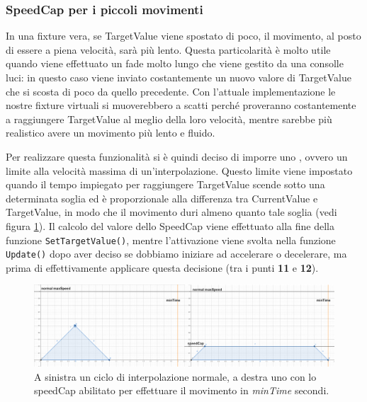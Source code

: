 \documentclass[main.tex]{subfiles}
\begin{document}
\subsubsection{SpeedCap per i piccoli movimenti}\label{subsubsec:4_2_Speedcap}
In una fixture vera, se TargetValue viene spostato di poco, il movimento, al posto di essere a piena velocità, sarà più lento. Questa particolarità è molto utile quando viene effettuato un fade molto lungo che viene gestito da una consolle luci: in questo caso viene inviato costantemente un nuovo valore di TargetValue che si scosta di poco da quello precedente. Con l'attuale implementazione le nostre fixture virtuali si muoverebbero a scatti perché proveranno costantemente a raggiungere TargetValue al meglio della loro velocità, mentre sarebbe più realistico avere un movimento più lento e fluido. 

Per realizzare questa funzionalità si è quindi deciso di imporre uno , ovvero un limite alla velocità massima di un'interpolazione. Questo limite viene impostato quando il tempo impiegato per raggiungere TargetValue scende sotto una determinata soglia ed è proporzionale alla differenza tra CurrentValue e TargetValue, in modo che il movimento duri almeno quanto tale soglia (vedi figura \ref{fig:4_speedCapIntro}). Il calcolo del valore dello SpeedCap viene effettuato alla fine della funzione \lstinline{SetTargetValue()}, mentre l'attivazione viene svolta nella funzione \lstinline{Update()} dopo aver deciso se dobbiamo iniziare ad accelerare o decelerare, ma prima di effettivamente applicare questa decisione (tra i punti \textbf{11} e \textbf{12}). \newline
\begin{figure}[H]
    \centering
    \includegraphics[width=1\linewidth]{img/interpolazione/speedCapIntro.png}
    \caption{A sinistra un ciclo di interpolazione normale, a destra uno con lo speedCap abilitato per effettuare il movimento in \textit{minTime} secondi.}
    \label{fig:4_speedCapIntro}
\end{figure}
\end{document}
